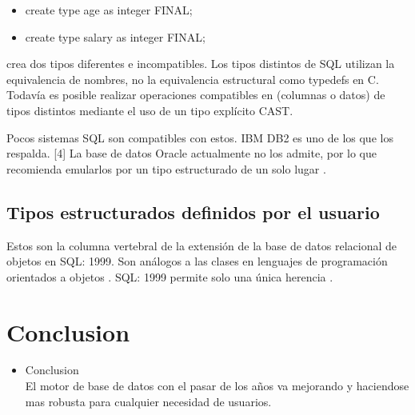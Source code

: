 \documentclass[preprint,12pt]{elsarticle}
\begin{document}
\begin{itemize}
\item 
create type age as integer FINAL;
\item create type salary as integer FINAL;
\end{itemize}

crea dos tipos diferentes e incompatibles. Los tipos distintos de SQL utilizan la equivalencia de nombres, no la equivalencia estructural como typedefs en C. Todavía es posible realizar operaciones compatibles en (columnas o datos) de tipos distintos mediante el uso de un tipo explícito CAST.

Pocos sistemas SQL son compatibles con estos. IBM DB2 es uno de los que los respalda. [4] La base de datos Oracle actualmente no los admite, por lo que recomienda emularlos por un tipo estructurado de un solo lugar . 

\subsection{Tipos estructurados definidos por el usuario }

Estos son la columna vertebral de la extensión de la base de datos relacional de objetos en SQL: 1999. Son análogos a las clases en lenguajes de programación orientados a objetos . SQL: 1999 permite solo una única herencia .
\section{Conclusion}
\begin{itemize}
\item Conclusion  \\

El motor de base de datos con el pasar de los años  va mejorando y haciendose mas robusta para cualquier necesidad de usuarios.



\end{itemize}
	
	

	
	\newpage
	
		 
\citep{B01}  
\citep{B02}


	
	
	
\end{document}
